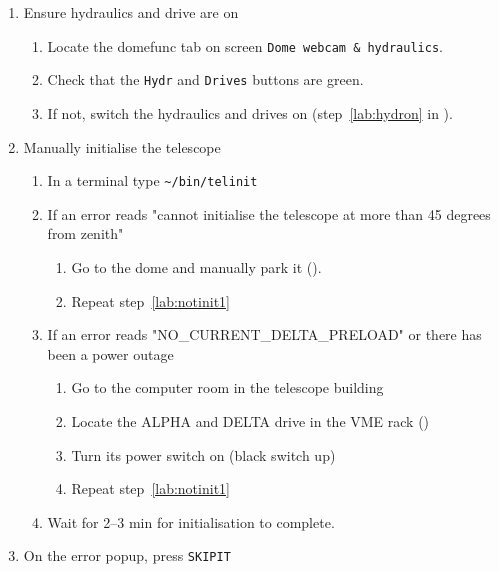 \documentclass[11pt,fleqn,a4paper]{book}
\def\home{\textasciitilde{}}
\begin{document}
\begin{enumerate}
    \item Ensure hydraulics and drive are on
        \begin{enumerate}
            \item Locate the \gls{domefunc} tab on screen \texttt{Dome webcam \& hydraulics}. 
            \item Check that the \texttt{Hydr} and \texttt{Drives} buttons are green.
            \item If not, switch the hydraulics and drives on (step~\ref{lab:hydron} in ).
        \end{enumerate}
    \item Manually initialise the telescope
        \begin{enumerate}
            \item\label{lab:notinit1} 
                In a terminal type \texttt{\home/bin/telinit}
            \item If an error reads "cannot initialise the 
                telescope at more than 45 degrees from zenith"
                \begin{enumerate}
                    \item Go to the dome and manually park it (). 
                    \item Repeat step~\ref{lab:notinit1}
                \end{enumerate}
            \item If an error reads "NO\_CURRENT\_DELTA\_PRELOAD" or there has been a power outage
                \begin{enumerate}
                    \item Go to the computer room in the telescope building
                    \item Locate the ALPHA and DELTA drive in the VME rack ()
                    \item Turn its power switch on (black switch up)
                    \item Repeat step~\ref{lab:notinit1}
                \end{enumerate}
            \item Wait for 2--3 min for initialisation to complete.
        \end{enumerate}
    \item On the error popup, press \texttt{SKIPIT}
\end{enumerate}
\end{document}
